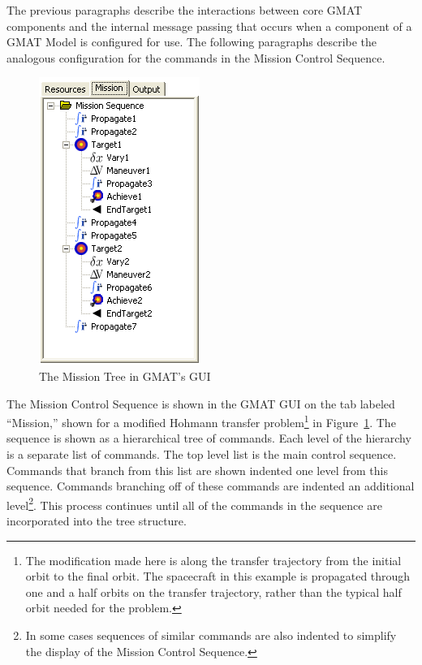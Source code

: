 The previous paragraphs describe the interactions between core GMAT components and the internal
message passing that occurs when a component of a GMAT Model is configured for use.  The following
paragraphs describe the analogous configuration for the commands in the Mission Control Sequence.

\begin{figure}[htb]
\begin{center}
\includegraphics[99,177]{Images/MissionTree.png}
\caption{\label{figure:MissionTree}The Mission Tree in GMAT's GUI}
\end{center}
\end{figure}

The Mission Control Sequence is shown in the GMAT GUI on the tab labeled ``Mission,'' shown for a
modified Hohmann transfer problem\footnote{The modification made here is along the transfer
trajectory from the initial orbit to the final orbit.  The spacecraft in this example is propagated
through one and a half orbits on the transfer trajectory, rather than the typical half orbit needed
for the problem.} in Figure~\ref{figure:MissionTree}.  The sequence is shown as a hierarchical tree
of commands.  Each level of the hierarchy is a separate list of commands.  The top level list is the
main control sequence.  Commands that branch from this list are shown indented one level from this
sequence.  Commands branching off of these commands are indented an additional level\footnote{In
some cases sequences of similar commands are also indented to simplify the display of the Mission
Control Sequence.}.  This process continues until all of the commands in the sequence are
incorporated into the tree structure.

